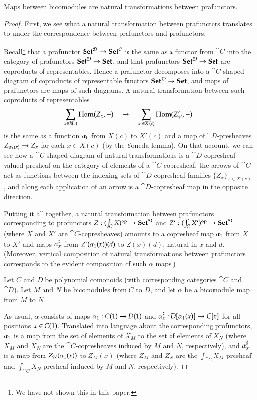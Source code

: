 \documentclass{amsart}
\begin{document}
\begin{prop}
  Maps between bicomodules are natural transformations between prafunctors.
\end{prop}
\begin{proof}
  First, we see what a natural transformation between prafunctors
  translates to under the correspondence between prafunctors and
  profunctors.

  Recall\footnote{We have not shown this in this paper.} that a
  prafunctor ${\normalfont\mathbf{Set}}^{\mathcal{D}} \to {\normalfont\mathbf{Set}}^{\mathcal{C}}$ is the same as a
  functor from $\cat{C}$ into the category of prafunctors
  ${\normalfont\mathbf{Set}}^{\mathcal{D}} \to {\normalfont\mathbf{Set}}$, and that prafunctors
  ${\normalfont\mathbf{Set}}^{\mathcal{D}} \to {\normalfont\mathbf{Set}}$ are coproducts of representables. Hence a
  prafunctor decomposes into a $\cat{C}$-shaped diagram of coproducts
  of representable functors ${\normalfont\mathbf{Set}}^{\mathcal{D}} \to {\normalfont\mathbf{Set}}$, and maps of
  prafunctors are maps of such diagrams. A natural transformation
  between such coproducts of representables
  \[\sum_{x \in X\!(c)}\operatorname{Hom}(Z_x, -) \quad \to \quad \sum_{x' \in X'\!(c)}\operatorname{Hom}(Z_{x'}',
    -)\] is the same as a function ${\alpha}_1$ from $X(c)$ to
  $X'(c)$ and a map of $\cat{D}$-presheaves
  ${Z_{{\alpha}_1(x)} \to Z_x}$ for each $x \in X(c)$ (by the
  Yoneda lemma). On that account, we can see how a $\cat{C}$-shaped
  diagram of natural transformations is a $\cat{D}$-copresheaf-valued
  presheaf on the category of elements of a $\cat{C}$-copresheaf: the
  arrows of $\cat{C}$ act as functions between the indexing sets of
  $\cat{D}$-copresheaf families $\{Z_x\}_{x \in X(c)}$, and along each
  application of an arrow is a $\cat{D}$-copresheaf map in the
  opposite direction.

  Putting it all together, a natural transformation between
  prafunctors corresponding to profunctors
  $Z : (\int_{\mathcal{C}} X)^{\mathrm{op}} \to {\normalfont\mathbf{Set}}^{\mathcal{D}}$ and
  $Z' : (\int_{\mathcal{C}} X')^{\mathrm{op}} \to {\normalfont\mathbf{Set}}^{\mathcal{D}}$ (where $X$ and
  $X'$ are $\cat{C}$-copresheaves) amounts to a copresheaf map
  ${\alpha}_1$ from $X$ to $X'$ and maps ${\alpha}^\sharp_{x}$
  from $Z'({\alpha}_1(x))(d)$ to $Z(x)(d)$, natural in $x$ and
  $d$. (Moreover, vertical composition of natural transformations
  between prafunctors corresponds to the evident composition of such
  $\alpha$ maps.)

  Let $C$ and $D$ be polynomial comonoids (with corresponding
  categories $\cat{C}$ and $\cat{D}$). Let $M$ and $N$ be bicomodules
  from $C$ to $D$, and let $\alpha$ be a bicomodule map from $M$ to
  $N$.

  As usual, $\alpha$ consists of maps
  ${\alpha}_1: C(1) \to D(1)$ and
  ${\alpha}^\sharp_{x}: D[{\alpha}_1(x)] \to C[x]$
  for all positions $x \in C(1)$. Translated into language about
  the corresponding profunctors, ${\alpha}_1$ is a map from the
  set of elements of $X_M$ to the set of elements of $X_N$ (where
  $X_M$ and $X_N$ are the $\cat{C}$-copresheaves induced by $M$ and
  $N$, respectively), and ${\alpha}^\sharp_{x}$ is a map from
  $Z_N({\alpha}_1(x))$ to $Z_M(x)$ (where $Z_M$ and $Z_N$ are
  the $\int_{\cat{C}}X_M$-presheaf and $\int_{\cat{C}}X_N$-presheaf
  induced by $M$ and $N$, respectively).


\end{proof}
\end{document}
